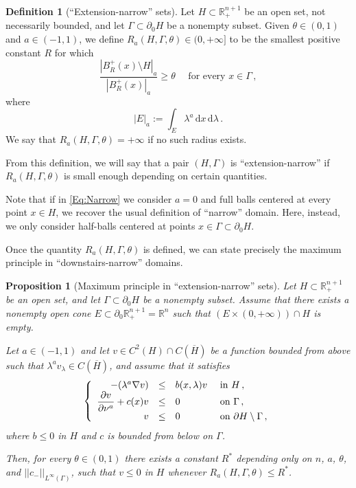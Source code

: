 \documentclass[12pt,reqno]{amsart}
\newtheorem{proposition}[theorem]{Proposition}
\theoremstyle{definition}
\newtheorem{definition}[theorem]{Definition}
\theoremstyle{remark}
\newcommand{\con}[1]{\mathbb{#1}}
\newcommand{\R}{\con{R}} %
\newcommand{\norm}[1]{\left | \left |{#1} \right | \right |}
\renewcommand{\d}{\,\mathrm{d}} %
\newcommand{\dx}{\,\mathrm{d}x} %
\newcommand\beqc[1]{\left\{\begin{array}{#1}}
\newcommand\eeqc{\end{array} \right.}
\def\PDEsystem{rcll}
\let\div\relax
\DeclareMathOperator{\div}{div}
\numberwithin{equation}{section}
\begin{document}
\begin{definition}[``Extension-narrow'' sets]
	Let $H \subset \R^{n+1}_+$ be an open set, not necessarily bounded, and let $\Gamma \subset \partial_0 H$ be a nonempty subset. Given $\theta \in (0,1)$ and $a\in (-1,1)$, we define $R_a(H,\Gamma,\theta) \in (0, +\infty]$ to be the smallest positive constant $R$ for which
	\begin{equation}
	\label{Eq:Narrow}
	\dfrac{|B^+_R(x)\setminus H|_a}{|B^+_R(x)|_a} \geq \theta \quad \text{ for every } x \in \Gamma\,,
	\end{equation}
	where 
	$$
	|E|_a := \int_E \lambda^a \dx \d \lambda\,.
	$$
	We say that $R_a(H,\Gamma,\theta) = + \infty$ if no such radius exists.
	
	From this definition, we will say that a pair $(H, \Gamma)$ is ``extension-narrow'' if $R_a(H,\Gamma,\theta)$ is small enough depending on certain quantities.
\end{definition}

Note that if in \eqref{Eq:Narrow} we consider $a=0$ and full balls centered at every point $x\in H$, we recover the usual definition of ``narrow'' domain. Here, instead, we only consider half-balls centered at points $x\in \Gamma \subset \partial_0H$.

Once the quantity  $R_a(H,\Gamma, \theta)$ is defined, we can state precisely the maximum principle in ``downstairs-narrow'' domains.

\begin{proposition}[Maximum principle in ``extension-narrow'' sets]
	\label{Prop:MaxPrincipleNarrow}
	Let $H \subset \R^{n+1}_+$ be an open set, and let $\Gamma \subset \partial_0 H$ be a nonempty subset. Assume that there exists a nonempty open cone $E\subset \partial_0 \R^{n+1}_+ = \R^n$ such that $(E \times (0,+\infty))\cap H$ is empty. 
	
	Let $a\in (-1,1)$ and let $v \in C^2 (H)\cap C(\overline{H})$ be a function bounded from above such that $\lambda^a v_\lambda \in C (\overline{H})$, and assume that it satisfies
	\begin{equation}
	\label{Eq:MaxPrincipleNarrow}
	\beqc{\PDEsystem}
	-\div(\lambda^a \nabla v) &\leq& b(x,\lambda) v & \text{ in } H\,, \\
	\dfrac{\partial v}{\partial \nu^a}  + c(x) v &\leq & 0 & \text{ on } \Gamma \,, \\
	v & \leq & 0 & \text{ on } \partial H \setminus \Gamma \,,
	\eeqc
	\end{equation}
	where $b \leq 0$ in $H$ and $c$ is bounded from below on $\Gamma$.
	
	Then, for every $\theta \in (0,1)$ there exists a constant $R^*$ depending only on $n$, $a$, $\theta$, and $\norm{c_-}_{L^\infty(\Gamma)}$, such that $v\leq 0 $ in $H$ whenever $R_a(H,\Gamma,\theta) \leq R^*$.
\end{proposition}
\end{document}
